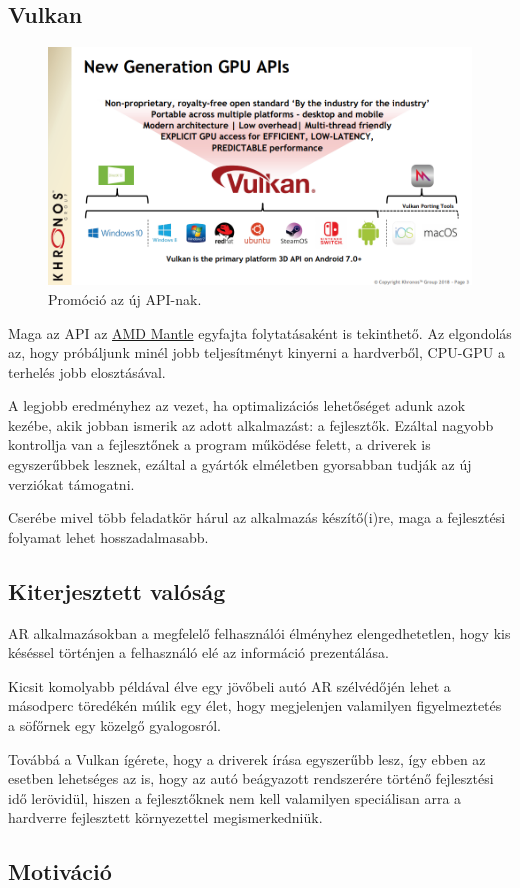 \subsection{Vulkan}
\begin{figure}[h]
	\includegraphics[width=\textwidth]{img/vulkanpromo}
	\centering
	\caption{Prom\'oci\'o az \'uj API-nak.
		\cite{vulkan1.1launchpres} }
\end{figure}
Maga az API az \href{https://www.amd.com/en-us/innovations/software-technologies/mantle}{AMD Mantle} egyfajta folytat\'asak\'ent is tekinthet\H o. Az elgondol\'as az, hogy pr\'ob\'aljunk min\'el jobb teljes\'itm\'enyt kinyerni a hardverb\H ol, CPU-GPU a terhel\'es jobb eloszt\'as\'aval.

A legjobb eredm\'enyhez az vezet, ha optimaliz\'aci\'os lehet\H os\'eget adunk azok kez\'ebe, akik jobban ismerik az adott alkalmaz\'ast: a fejleszt\H ok.
Ez\'altal nagyobb kontrollja van a fejleszt\H onek a program m\H uk\"od\'ese felett, a driverek is egyszer\H ubbek lesznek, ez\'altal a gy\'art\'ok elm\'eletben gyorsabban tudj\'ak az \'uj verzi\'okat t\'amogatni.

Cser\'ebe mivel t\"obb feladatk\"or h\'arul az alkalmaz\'as k\'esz\'it\H o(i)re, maga a fejleszt\'esi folyamat lehet hosszadalmasabb.

\subsection{Kiterjesztett val\'os\'ag}
AR alkalmaz\'asokban a megfelel\H o felhaszn\'al\'oi \'elm\'enyhez elengedhetetlen, hogy kis k\'es\'essel t\"ort\'enjen a felhaszn\'al\'o el\'e az inform\'aci\'o prezent\'al\'asa. 

Kicsit komolyabb p\'eld\'aval \'elve egy j\"ov\H obeli aut\'o AR sz\'elv\'ed\H oj\'en lehet a m\'asodperc t\"ored\'ek\'en m\'ulik egy \'elet, hogy megjelenjen valamilyen figyelmeztet\'es a s\"of\H ornek egy k\"ozelg\H o gyalogosr\'ol.

Tov\'abb\'a a Vulkan \'ig\'erete, hogy a driverek \'ir\'asa egyszer\H ubb lesz, \'igy ebben az esetben lehets\'eges az is, hogy az aut\'o be\'agyazott rendszer\'ere t\"ort\'en\H o fejleszt\'esi id\H o ler\"ovid\"ul, hiszen a fejleszt\H oknek nem kell valamilyen speci\'alisan arra a hardverre fejlesztett k\"ornyezettel megismerkedni\"uk. 

\subsection{Motiv\'aci\'o}

